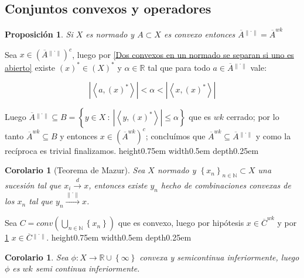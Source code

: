\documentclass[11pt]{article}
\newcommand{\R}{{\mathbb{R}}}
\newcommand{\N}{{\mathbb{N}}}
\newcommand\tq{~:~}
\newcommand{\dual}[1]{\left(#1\right)^{\ast}}
\newcommand{\norm}[1]{\left\lVert#1\right\rVert}
\newcommand{\abs}[1]{\left\lvert#1\right\rvert}
\newcommand{\ip}[1]{\left\langle#1\right\rangle}
\newcommand{\sett}[1]{\left\lbrace#1\right\rbrace}
\newcommand{\Bigcup}[2]{\bigcup\limits_{#1}{#2}}
\numberwithin{theorem}{subsection}
\newtheorem{proposition}[theorem]{Proposici\'on}
\newtheorem{corollary}[theorem]{Corolario}
\newenvironment{proof}[1][Demostraci\'on]{\begin{trivlist}
		\item[\hskip \labelsep {\bfseries #1}]}{\end{trivlist}}
\newcommand{\qed}{\nobreak \ifvmode \relax \else
	\ifdim\lastskip<1.5em \hskip-\lastskip
	\hskip1.5em plus0em minus0.5em \fi \nobreak
	\vrule height0.75em width0.5em depth0.25em\fi}
\begin{document}
\subsection{Conjuntos convexos y operadores}

\begin{proposition}
	\label{Clausura fuerta es clausura debil en un convexo}
	Si $X$ es normado y $A \subset X$ es convexo entonces $\overline{A}^{\norm{.}} = \overline{A}^{wk}$
\end{proposition}

\begin{proof}
	Sea $x \in \left(\overline{A}^{\norm{.}}\right)^c$, luego por \ref{Dos convexos en un normado se separan si uno es abierto} existe $\dual{x} \in \dual{X}$ y $\alpha \in \mathbb{R}$ tal que para todo $a \in \overline{A}^{\norm{.}}$ vale:
	
	\begin{equation*}
	\abs{\ip{a,\dual{x}}} < \alpha < \abs{\ip{x,\dual{x}}}
	\end{equation*}
	
	Luego $\overline{A}^{\norm{.}} \subseteq B = \sett{y \in X \tq 	\abs{\ip{y,\dual{x}}} \leq \alpha}$ que es $wk$ cerrado; por lo tanto $\overline{A}^{wk} \subseteq B$ y entonces $x \in \left(\overline{A}^{wk}\right)^c$; conclu\'imos que $\overline{A}^{wk} \subseteq \overline{A}^{\norm{.}}$ y como la rec\'iproca es trivial finalizamos. \qed
\end{proof}

\begin{corollary}[Teorema de Mazur]
	\label{Teorema de Mazur}
	Sea $X$ normado y $\sett{x_n}_{n \in \N} \subset X$ una sucesi\'on tal que $x_i \xrightarrow{d} x$, entonces existe $y_n$ hecho de combinaciones convexas de los $x_n$ tal que $y_n \xrightarrow{\norm{.}} x$. 
\end{corollary}

\begin{proof}
	Sea $C = conv \left(\Bigcup{n \in \N}{\sett{x_n}}\right)$ que es convexo, luego por hip\'otesis $x \in \overline{C}^{wk}$ y por \ref{Clausura fuerta es clausura debil en un convexo} $x \in \overline{C}^{\norm{.}}$. \qed
\end{proof}

\begin{corollary}
	Sea $\phi : X \rightarrow \R \cup \sett{\infty}$ convexa y semicontinua inferiormente, luego $\phi$ es $wk$ semi continua inferiormente.
\end{corollary}
\end{document}
